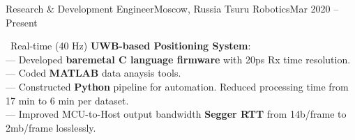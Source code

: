 \resumeSubheading
  {Research \& Development Engineer}{Moscow, Russia}
  {Tsuru Robotics}{Mar 2020 -- Present}
  \begin{itemize}[leftmargin=0in, label={}]
    \small{\item{
      {\textbullet \ Real-time (40 Hz) \textbf{UWB-based Positioning System}:}\\
      {— Developed \textbf{baremetal C language firmware} with 20ps Rx time resolution.}\\
      {— Coded \textbf{MATLAB} data anaysis tools.}\\
      {— Constructed \textbf{Python} pipeline for automation. Reduced processing time from 17 min to 6 min per dataset.}\\
      {— Improved MCU-to-Host output bandwidth \textbf{Segger RTT} from 14b/frame to 2mb/frame losslessly.}\\
    }}
  \end{itemize}
